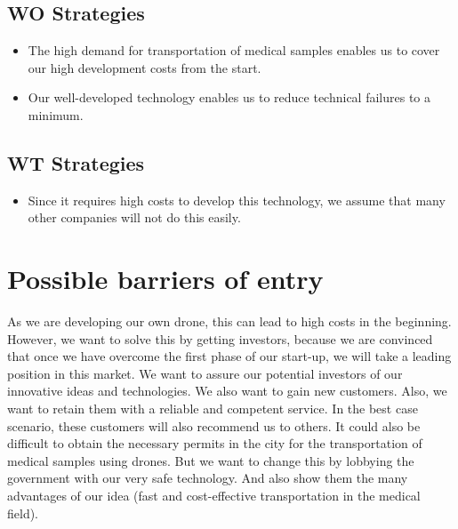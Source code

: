 \subsection{WO Strategies}
\begin{itemize}
  \item The high demand for transportation of medical samples enables us to cover our high development costs from the start.
  \item Our well-developed technology enables us to reduce technical failures to a minimum.
\end{itemize}
\subsection{WT Strategies}
\begin{itemize}
  \item Since it requires high costs to develop this technology, we assume that many other companies will not do this easily.
\end{itemize}
\section{Possible barriers of entry}
As we are developing our own drone, this can lead to high costs in the beginning. However, we want to solve this by getting investors, because we are convinced that once we have overcome the first phase of our start-up, we will take a leading position in this market. We want to assure our potential investors of our innovative ideas and technologies. We also want to gain new customers. Also, we want to retain them with a reliable and competent service. In the best case scenario, these customers will also recommend us to others.
\newline
It could also be difficult to obtain the necessary permits in the city for the transportation of medical samples using drones. But we want to change this by lobbying the government with our very safe technology. And also show them the many advantages of our idea (fast and cost-effective transportation in the medical field).
